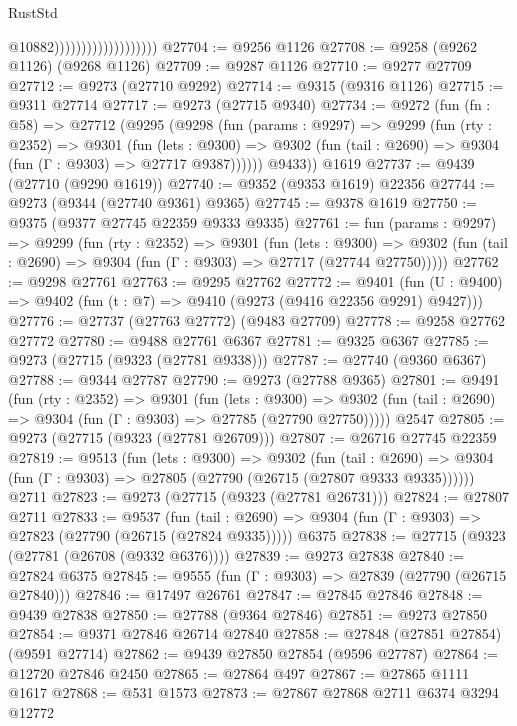 \begin{lexlean}{RustStd}
\begin{coremodule}
{\begin{coremodule}
{{{{{{{{{{{{{{{{{{{{{{{{{{{{{{{{{{{{{{{{{{{{{{{{{{{{{{{                                          @10882)))))))))))))))))))
@27704 := @9256 @1126
@27708 := @9258 (@9262 @1126) (@9268 @1126)
@27709 := @9287 @1126
@27710 := @9277 @27709
@27712 := @9273 (@27710 @9292)
@27714 := @9315 (@9316 @1126)
@27715 := @9311 @27714
@27717 := @9273 (@27715 @9340)
@27734 := @9272
    (fun (fn : @58) =>
    @27712
      (@9295
        (@9298
          (fun (params : @9297) =>
          @9299
            (fun (rty : @2352) =>
            @9301
              (fun (lets : @9300) =>
              @9302 (fun (tail : @2690) => @9304 (fun (Γ : @9303) => @27717 @9387))))))
        @9433))
    @1619
@27737 := @9439 (@27710 (@9290 @1619))
@27740 := @9352 (@9353 @1619) @22356
@27744 := @9273 (@9344 (@27740 @9361) @9365)
@27745 := @9378 @1619
@27750 := @9375 (@9377 @27745 @22359 @9333 @9335)
@27761 := fun (params : @9297) =>
  @9299
    (fun (rty : @2352) =>
    @9301
      (fun (lets : @9300) =>
      @9302 (fun (tail : @2690) => @9304 (fun (Γ : @9303) => @27717 (@27744 @27750)))))
@27762 := @9298 @27761
@27763 := @9295 @27762
@27772 := @9401
    (fun (U : @9400) => @9402 (fun (t : @7) => @9410 (@9273 (@9416 @22356 @9291) @9427)))
@27776 := @27737 (@27763 @27772) (@9483 @27709)
@27778 := @9258 @27762 @27772
@27780 := @9488 @27761 @6367
@27781 := @9325 @6367
@27785 := @9273 (@27715 (@9323 (@27781 @9338)))
@27787 := @27740 (@9360 @6367)
@27788 := @9344 @27787
@27790 := @9273 (@27788 @9365)
@27801 := @9491
    (fun (rty : @2352) =>
    @9301
      (fun (lets : @9300) =>
      @9302 (fun (tail : @2690) => @9304 (fun (Γ : @9303) => @27785 (@27790 @27750)))))
    @2547
@27805 := @9273 (@27715 (@9323 (@27781 @26709)))
@27807 := @26716 @27745 @22359
@27819 := @9513
    (fun (lets : @9300) =>
    @9302
      (fun (tail : @2690) =>
      @9304 (fun (Γ : @9303) => @27805 (@27790 (@26715 (@27807 @9333 @9335))))))
    @2711
@27823 := @9273 (@27715 (@9323 (@27781 @26731)))
@27824 := @27807 @2711
@27833 := @9537
    (fun (tail : @2690) => @9304 (fun (Γ : @9303) => @27823 (@27790 (@26715 (@27824 @9335)))))
    @6375
@27838 := @27715 (@9323 (@27781 (@26708 (@9332 @6376))))
@27839 := @9273 @27838
@27840 := @27824 @6375
@27845 := @9555 (fun (Γ : @9303) => @27839 (@27790 (@26715 @27840)))
@27846 := @17497 @26761
@27847 := @27845 @27846
@27848 := @9439 @27838
@27850 := @27788 (@9364 @27846)
@27851 := @9273 @27850
@27854 := @9371 @27846 @26714 @27840
@27858 := @27848 (@27851 @27854) (@9591 @27714)
@27862 := @9439 @27850 @27854 (@9596 @27787)
@27864 := @12720 @27846 @2450
@27865 := @27864 @497
@27867 := @27865 @1111 @1617
@27868 := @531 @1573
@27873 := @27867 @27868 @2711 @6374 @3294 @12772
}}}}}}}}}}}}}}}}}}}}}}}}}}}}}}}}}}}}}}}}}}}}}}}}}}}}}}}
\end{coremodule}}
\end{coremodule}
\end{lexlean}
